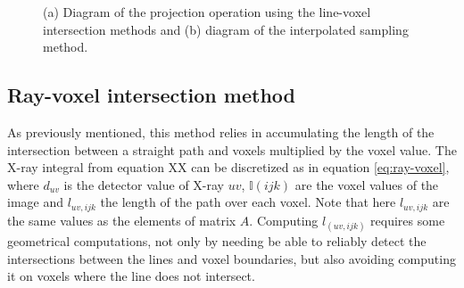 \begin{figure}

\begin{center} 
 
\caption{\label{fig:Amatrix}(a) Diagram of the projection operation using the line-voxel intersection methods and (b) diagram of the interpolated sampling method.} 
\end{center} 
\end{figure}

\FloatBarrier

\subsection{Ray-voxel intersection method}

As previously mentioned, this method relies in accumulating the length of the intersection between a straight path and voxels multiplied by the voxel value. The X-ray integral from equation XX can be discretized as in equation \ref{eq:ray-voxel}, where $d_{uv}$ is the detector value of X-ray $uv$, $\mathbb{I}(ijk)$ are the voxel values of the image and $l_{uv,ijk}$ the length of the path over each voxel. Note that here $l_{uv,ijk}$ are the same values as the elements of matrix $A$. Computing $l_{(uv,ijk)}$ requires some geometrical computations, not only by needing be able to reliably detect the intersections between the lines and voxel boundaries, but also avoiding computing it on voxels where the line does not intersect.

